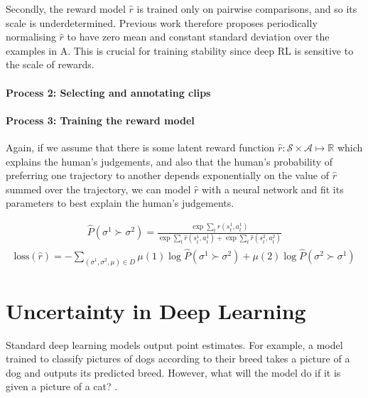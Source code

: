 \documentclass[11pt, a4paper, bibliography=totoc]{report}
\newcommand{\reals}{\mathbb{R}}
\newcommand{\rp}{\hat{r}}
\newcommand{\annbuff}{\mathrm{A}}
\begin{document}
Secondly, the reward model $ \rp $ is trained only on pairwise comparisons, and so its scale is underdetermined. Previous work therefore proposes periodically normalising $ \rp $ to have zero mean and constant standard deviation over the examples in $ \annbuff $. This is crucial for training stability since deep RL is sensitive to the scale of rewards. %

\subsubsection{Process 2: Selecting and annotating clips}

\subsubsection{Process 3: Training the reward model}
Again, if we assume that there is some latent reward function $ \hat{r} : \mathcal{S} \times \mathcal{A} \mapsto \reals $ which explains the human's judgements, and also that the human's probability of preferring one trajectory to another depends exponentially on the value of $ \hat{r} $ summed over the trajectory, we can model $ \hat{r} $ with a neural network and fit its parameters to best explain the human's judgements.

\begin{align*}
\hat{P}(\sigma^1 \succ \sigma^2) = \frac{\exp \sum_t \hat{r}(s_t^1, a_t^1)}{\exp \sum_t \hat{r}(s_t^1, a_t^1) + \exp \sum_t \hat{r}(s_t^2, a_t^2)}
\end{align*}
\begin{align*}
\text{loss}(\hat{r}) = -\sum_{(\sigma^1, \sigma^2, \mu) \in D} \mu(1) \log \hat{P}(\sigma^1 \succ \sigma^2) + \mu(2)\log \hat{P}(\sigma^2 \succ \sigma^1)
\end{align*}


\chapter{Uncertainty in Deep Learning}
Standard deep learning models output point estimates. For example, a model trained to classify pictures of dogs according to their breed takes a picture of a dog and outputs its predicted breed. However, what will the model do if it is given a picture of a cat? \cite{Gal2017a}.
\end{document}
